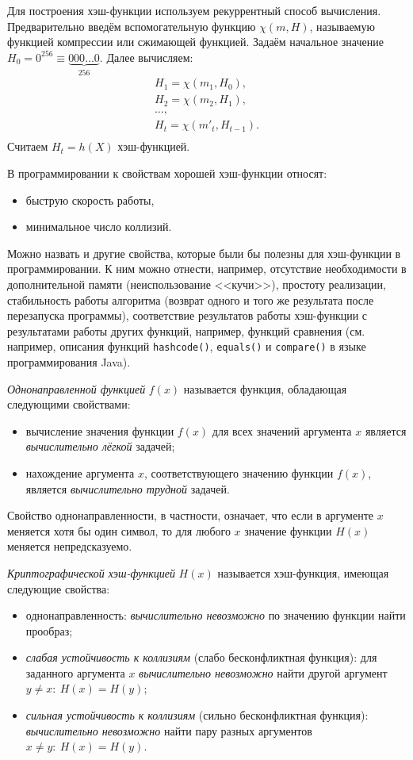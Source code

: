 Для построения хэш-функции используем рекуррентный способ вычисления. Предварительно введём вспомогательную функцию $\chi(m, H)$, называемую функцией компрессии или сжимающей функцией. Задаём начальное значение $H_{0} = 0^{256} \equiv \underbrace{000 \ldots 0}_{256} $. Далее вычисляем:
\[ \begin{array}{l}
    H_1 = \chi( m_1, H_0), \\
    H_2 = \chi( m_2, H_1), \\
    \dots,\\
    H_t = \chi( m'_t, H_{t-1}). \\
\end{array} \]
Считаем $H_{t} = h(X)$ хэш-функцией.
\exampleend

В программировании к свойствам хорошей хэш-функции относят:
\begin{itemize}
    \item быструю скорость работы,
    \item минимальное число коллизий.
\end{itemize}

Можно назвать и другие свойства, которые были бы полезны для хэш-функции в программировании. К ним можно отнести, например, отсутствие необходимости в дополнительной памяти (неиспользование <<кучи>>), простоту реализации, стабильность работы алгоритма (возврат одного и того же результата после перезапуска программы), соответствие результатов работы хэш-функции с результатами работы других функций, например, функций сравнения (см. например, описания функций \texttt{hashcode()}, \texttt{equals()} и \texttt{compare()} в языке программирования Java).

\emph{Однонаправленной функцией} $f(x)$ называется функция, обладающая следующими свойствами:
\begin{itemize}
    \item вычисление значения функции $f(x)$ для всех значений аргумента $x$ является \emph{вычислительно лёгкой} задачей;
    \item нахождение аргумента $x$, соответствующего значению функции $f(x)$, является \emph{вычислительно трудной} задачей.
\end{itemize}

Свойство однонаправленности, в частности, означает, что если в аргументе $x$ меняется хотя бы один символ, то для любого $x$ значение функции $H(x)$ меняется непредсказуемо.

\emph{Криптографической хэш-функцией} $H(x)$ называется хэш-функция, имеющая следующие свойства:
\begin{itemize}
    \item однонаправленность: \emph{вычислительно невозможно} по значению функции найти прообраз;
    \item \emph{слабая устойчивость к коллизиям} (слабо бесконфликтная функция): для заданного аргумента $x$ \emph{вычислительно невозможно} найти другой аргумент $y \neq x: ~ H(x) = H(y)$;
    \item \emph{сильная устойчивость к коллизиям} (сильно бесконфликтная функция): \emph{вычислительно невозможно} найти пару разных аргументов $x \neq y: ~ H(x) = H(y)$.
\end{itemize}

